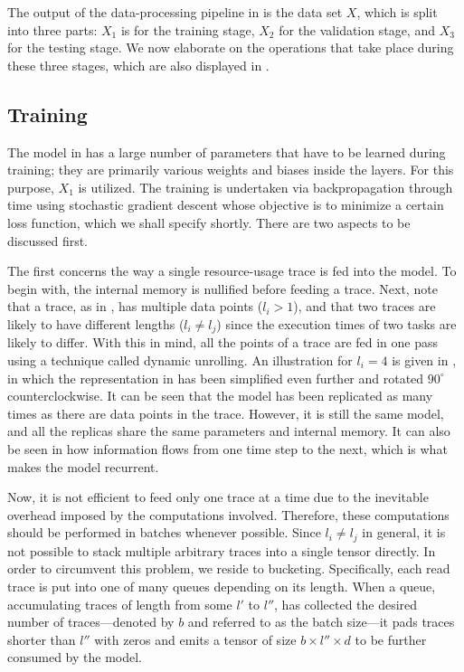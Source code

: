 The output of the data-processing pipeline in  is the data set $X$,
which is split into three parts: $X_1$ is for the training stage, $X_2$ for the
validation stage, and $X_3$ for the testing stage. We now elaborate on the
operations that take place during these three stages, which are also displayed
in .

\subsection{Training} 
The model in  has a large number of parameters that have to be
learned during training; they are primarily various weights and biases inside
the layers. For this purpose, $X_1$ is utilized. The training is undertaken via
backpropagation through time using stochastic gradient descent
\cite{goodfellow2016} whose objective is to minimize a certain loss function,
which we shall specify shortly. There are two aspects to be discussed first.


The first concerns the way a single resource-usage trace is fed into the model.
To begin with, the internal memory is nullified before feeding a trace. Next,
note that a trace, as in , has multiple data points ($l_i > 1$), and
that two traces are likely to have different lengths ($l_i \neq l_j$) since the
execution times of two tasks are likely to differ. With this in mind, all the
points of a trace are fed in one pass using a technique called dynamic
unrolling. An illustration for $l_i = 4$ is given in , in which the
representation in  has been simplified even further and rotated
$90^\circ$ counterclockwise. It can be seen that the model has been replicated
as many times as there are data points in the trace. However, it is still the
same model, and all the replicas share the same parameters and internal memory.
It can also be seen in  how information flows from one time step to
the next, which is what makes the model recurrent.

Now, it is not efficient to feed only one trace at a time due to the inevitable
overhead imposed by the computations involved. Therefore, these computations
should be performed in batches whenever possible. Since $l_i \neq l_j$ in
general, it is not possible to stack multiple arbitrary traces into a single
tensor directly. In order to circumvent this problem, we reside to bucketing.
Specifically, each read trace is put into one of many queues depending on its
length. When a queue, accumulating traces of length from some $l'$ to $l''$, has
collected the desired number of traces---denoted by $b$ and referred to as the
batch size---it pads traces shorter than $l''$ with zeros and emits a tensor of
size $b \times l'' \times d$ to be further consumed by the model.


